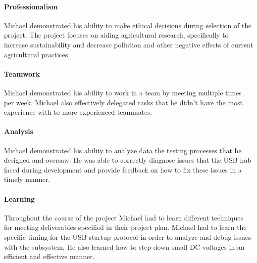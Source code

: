 \documentclass[../../main.tex]{subfiles}
\begin{document}
\paragraph{Professionalism}
Michael demonstrated his ability to make ethical decisions during selection of the project. The project focuses on aiding agricultural research, specifically to increase sustainability and decrease pollution and other negative effects of current agricultural practices.

\paragraph{Teamwork}
Michael demonstrated his ability to work in a team by meeting multiple times per week. Michael also effectively delegated tasks that he didn't have the most experience with to more experienced teammates.

\paragraph{Analysis}
Michael demonstrated his ability to analyze data the testing processes that he designed and oversaw. He was able to correctly diagnose issues that the USB hub faced during development and provide feedback on how to fix these issues in a timely manner.

\paragraph{Learning}
Throughout the course of the project Michael had to learn different techniques for meeting deliverables specified in their project plan. Michael had to learn the specific timing for the USB startup protocol in order to analyze and debug issues with the subsystem. He also learned how to step down small DC voltages in an efficient and effective manner.
\end{document}

